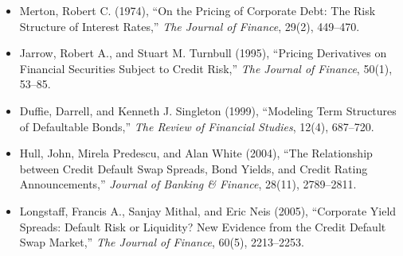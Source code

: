 

\begin{itemize}

\item Merton, Robert C. (1974),
``On the Pricing of Corporate Debt: The Risk Structure of Interest Rates,''
\emph{The Journal of Finance}, 29(2), 449--470.

\item Jarrow, Robert A., and Stuart M. Turnbull (1995),
``Pricing Derivatives on Financial Securities Subject to Credit Risk,''
\emph{The Journal of Finance}, 50(1), 53--85.

\item Duffie, Darrell, and Kenneth J. Singleton (1999),
``Modeling Term Structures of Defaultable Bonds,''
\emph{The Review of Financial Studies}, 12(4), 687--720.

\item Hull, John, Mirela Predescu, and Alan White (2004),
``The Relationship between Credit Default Swap Spreads, Bond Yields, and Credit Rating Announcements,''
\emph{Journal of Banking \& Finance}, 28(11), 2789--2811.

\item Longstaff, Francis A., Sanjay Mithal, and Eric Neis (2005),
``Corporate Yield Spreads: Default Risk or Liquidity? New Evidence from the Credit Default Swap Market,''
\emph{The Journal of Finance}, 60(5), 2213--2253.

\end{itemize}



